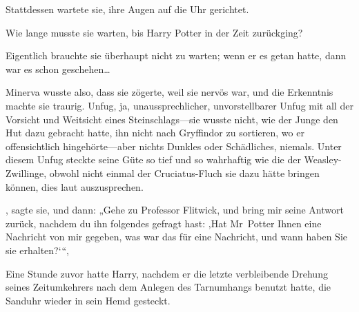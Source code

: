 Stattdessen wartete sie, ihre Augen auf die Uhr gerichtet.

Wie lange musste sie warten, bis Harry Potter in der Zeit zurückging?

Eigentlich brauchte sie überhaupt nicht zu warten; wenn er es getan hatte, dann war es schon geschehen…

Minerva wusste also, dass sie zögerte, weil sie nervös war, und die Erkenntnis machte sie traurig. Unfug, ja, unaussprechlicher, unvorstellbarer Unfug mit all der Vorsicht und Weitsicht eines Steinschlags—sie wusste nicht, wie der Junge den Hut dazu gebracht hatte, ihn nicht nach Gryffindor zu sortieren, wo er offensichtlich hingehörte—aber nichts Dunkles oder Schädliches, niemals. Unter diesem Unfug steckte seine Güte so tief und so wahrhaftig wie die der Weasley-Zwillinge, obwohl nicht einmal der Cruciatus-Fluch sie dazu hätte bringen können, dies laut auszusprechen.

, sagte sie, und dann: „Gehe zu Professor Flitwick, und bring mir seine Antwort zurück, nachdem du ihn folgendes gefragt hast: ‚Hat Mr~Potter Ihnen eine Nachricht von mir gegeben, was war das für eine Nachricht, und wann haben Sie sie erhalten?‘“,

\later

Eine Stunde zuvor hatte Harry, nachdem er die letzte verbleibende Drehung seines Zeitumkehrers nach dem Anlegen des Tarnumhangs benutzt hatte, die Sanduhr wieder in sein Hemd gesteckt.

